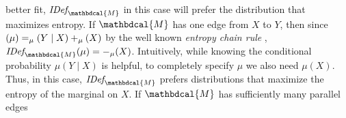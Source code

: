 \documentclass[letterpaper]{article} %
\theoremstyle{plain}
\theoremstyle{definition}
\theoremstyle{remark}
\let\H\relax
\DeclareMathOperator{\H}{\mathrm{H}} %
\newcommand{\dg}[1]{\mathbdcal{#1}}
\newcommand{\IDef}[1]{\mathit{IDef}_{\!#1}}
\begin{document}
better fit, $\IDef{\dg M}$ in this case will prefer the distribution that
maximizes entropy. If $\dg M$ has one edge from $X$ to $Y$, then since $\H(\mu) =
\H_{\mu}(Y \mid X) + \H_\mu(X)$
by the well known \emph{entropy chain rule} \cite{mackay2003information},
$\IDef{\dg   M}(\mu) = -\H_{\mu}(X)$. Intuitively,
while knowing the conditional probability $\mu(Y \mid X)$ is helpful, to
completely specify $\mu$ we also need $\mu(X)$. Thus, in this case, $\IDef{\dg
M}$ prefers distributions that maximize the entropy of the marginal
on $X$. 
If $\dg M$ has sufficiently many parallel edges
\end{document}
